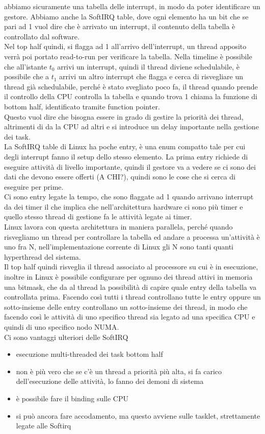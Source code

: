\documentclass[12pt, oneside]{extbook}
\begin{document}
abbiamo sicuramente una tabella delle interrupt, in modo da poter identificare un gestore. Abbiamo anche la SoftIRQ table, dove ogni elemento ha un bit che se pari ad 1 vuol dire che è arrivato un interrupt, il contenuto della tabella è controllato dal software.\\Nel top half quindi, si flagga ad 1 all'arrivo dell'interrupt, un thread apposito verrà poi portato read-to-run per verificare la tabella. Nella timeline è possibile che all'istante $t_0$ arrivi un interrupt, quindi il thread diviene schedulabile, è possibile che a $t_1$ arrivi un altro interrupt che flagga e cerca di risvegliare un thread già schedulabile, perché è stato svegliato poco fa, il thread quando prende il controllo della CPU controlla la tabella e quando trova 1 chiama la funzione di bottom half, identificato tramite function pointer.\\Questo vuol dire che bisogna essere in grado di gestire la priorità dei thread, altrimenti di da la CPU ad altri e si introduce un delay importante nella gestione dei task.\\La SoftIRQ table di Linux ha poche entry, è una enum compatto tale per cui degli interrupt fanno il setup dello stesso elemento. La prima entry richiede di eseguire attività di livello importante, quindi il gestore va a vedere se ci sono dei dati che devono essere offerti (A CHI?), quindi sono le cose che si cerca di eseguire per prime.\\Ci sono entry legate la tempo, che sono flaggate ad 1 quando arrivano interrupt da dei timer il che implica che nell'architettura hardware ci sono più timer e quello stesso thread di gestione fa le attività legate ai timer.\\Linux lavora con questa architettura in maniera parallela, perché quando risvegliamo un thread per controllare la tabella ed andare a processa un'attività è uno fra N, nell'implementazione corrente di Linux gli N sono tanti quanti hyperthread del sistema.\\Il top half quindi risveglia il thread associato al processore su cui è in esecuzione, inoltre in Linux è possibile configurare per ognuno dei thread attivi in memoria una bitmask, che da al thread la possibilità di capire quale entry della tabella va controllata prima. Facendo così tutti i thread controllano tutte le entry oppure un sotto-insieme delle entry controllano un sotto-insieme dei thread, in modo che facendo così le attività di uno specifico thread sia legato ad una specifica CPU e quindi di uno specifico nodo NUMA.\\Ci sono vantaggi ulteriori delle SoftIRQ
\begin{itemize}
\item esecuzione multi-threaded dei task bottom half
\item non è più vero che se c'è un thread a priorità più alta, si fa carico dell'esecuzione delle attività, lo fanno dei demoni di sistema
\item è possibile fare il binding sulle CPU
\item si può ancora fare accodamento, ma questo avviene sulle tasklet, strettamente legate alle Softirq
\end{itemize}
\end{document}
